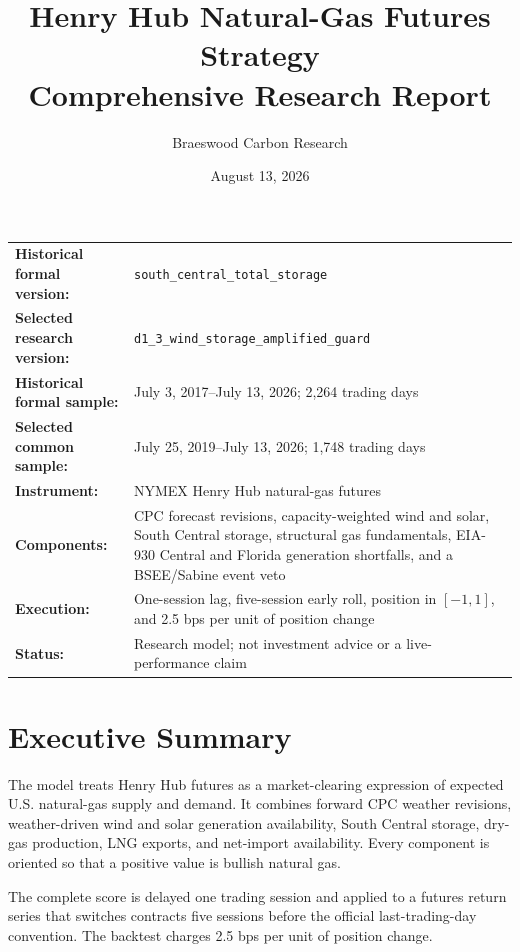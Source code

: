 \documentclass[11pt,a4paper]{article}
\title{\textbf{Henry Hub Natural-Gas Futures Strategy}\\
\large Comprehensive Research Report}
\author{Braeswood Carbon Research}
\date{August 13, 2026}
\newcommand{\code}[1]{\texttt{#1}}
\begin{document}
\maketitle

\begin{center}
\begin{tabularx}{0.96\textwidth}{>{\bfseries}p{3.3cm}Y}
Historical formal version: & \code{south\_central\_total\_storage}\\
Selected research version: & \code{d1\_3\_wind\_storage\_amplified\_guard}\\
Historical formal sample: & July 3, 2017--July 13, 2026; 2,264 trading days\\
Selected common sample: & July 25, 2019--July 13, 2026; 1,748 trading days\\
Instrument: & NYMEX Henry Hub natural-gas futures\\
Components: & CPC forecast revisions, capacity-weighted wind and solar,
South Central storage, structural gas fundamentals, EIA-930 Central and
Florida generation shortfalls, and a BSEE/Sabine event veto\\
Execution: & One-session lag, five-session early roll, position in $[-1,1]$,
and 2.5 bps per unit of position change\\
Status: & Research model; not investment advice or a live-performance claim
\end{tabularx}
\end{center}

\tableofcontents
\newpage

\section{Executive Summary}

The model treats Henry Hub futures as a market-clearing expression of expected
U.S. natural-gas supply and demand. It combines forward CPC weather revisions,
weather-driven wind and solar generation availability, South Central storage,
dry-gas production, LNG exports, and net-import availability. Every component
is oriented so that a positive value is bullish natural gas.

The complete score is delayed one trading session and applied to a futures
return series that switches contracts five sessions before the official
last-trading-day convention. The backtest charges 2.5 bps per unit of position
change.
\end{document}
